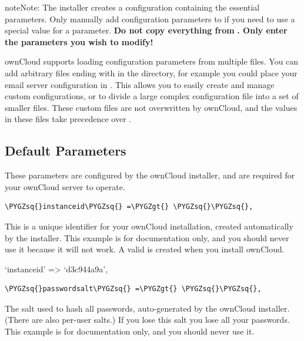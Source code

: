 \documentclass[letterpaper,10pt,english]{sphinxmanual}
\def\PYGZgt{\char`\>}
\def\PYGZsq{\char`\'}
\renewcommand\PYGZsq{\textquotesingle}
\begin{document}
\begin{notice}{note}{Note:}
The installer creates a configuration containing the essential parameters.
Only manually add configuration parameters to  if you need to
use a special value for a parameter. \textbf{Do not copy everything from}
 \textbf{. Only enter the parameters you wish to modify!}
\end{notice}

ownCloud supports loading configuration parameters from multiple files.
You can add arbitrary files ending with  in the 
directory, for example you could place your email server configuration
in . This allows you to easily create and manage
custom configurations, or to divide a large complex configuration file
into a set of smaller files. These custom files are not overwritten by
ownCloud, and the values in these files take precedence over .


\subsection{Default Parameters}
\label{configuration_server/config_sample_php_parameters:default-parameters}
These parameters are configured by the ownCloud installer, and are required
for your ownCloud server to operate.

\begin{Verbatim}[commandchars=\\\{\}]
\PYGZsq{}instanceid\PYGZsq{} =\PYGZgt{} \PYGZsq{}\PYGZsq{},
\end{Verbatim}

This is a unique identifier for your ownCloud installation, created
automatically by the installer. This example is for documentation only,
and you should never use it because it will not work. A valid 
is created when you install ownCloud.

`instanceid' =\textgreater{} `d3c944a9a',

\begin{Verbatim}[commandchars=\\\{\}]
\PYGZsq{}passwordsalt\PYGZsq{} =\PYGZgt{} \PYGZsq{}\PYGZsq{},
\end{Verbatim}

The salt used to hash all passwords, auto-generated by the ownCloud
installer. (There are also per-user salts.) If you lose this salt you lose
all your passwords. This example is for documentation only, and you should
never use it.
\end{document}
